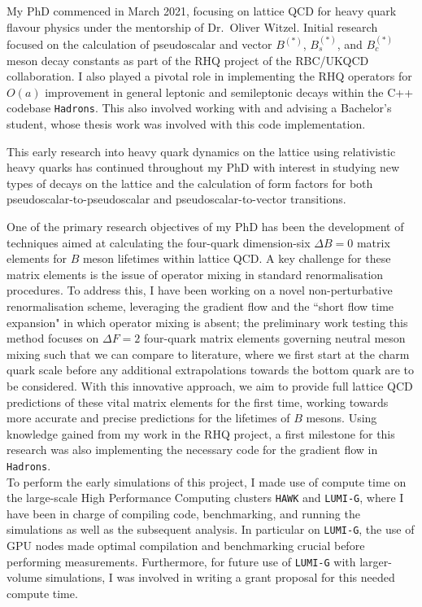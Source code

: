 \documentclass[11pt, a4paper]{awesome-cv}
\begin{document}
\begin{cvletter}
My PhD commenced in March 2021, focusing on lattice QCD for heavy quark flavour physics under the mentorship of Dr.~Oliver Witzel. 
Initial research focused on the calculation of pseudoscalar and vector $B^{(*)}$, $B_s^{(*)}$, and $B_c^{(*)}$ meson decay constants as part of the RHQ project of the RBC/UKQCD collaboration. 
I also played a pivotal role in implementing the RHQ operators for $O(a)$ improvement in general leptonic and semileptonic decays within the C++ codebase {\tt Hadrons}. 
This also involved working with and advising a Bachelor's student, whose thesis work was involved with this code implementation.

This early research into heavy quark dynamics on the lattice using relativistic heavy quarks has continued throughout my PhD with interest in studying new types of decays on the lattice and the calculation of form factors for both pseudoscalar-to-pseudoscalar and pseudoscalar-to-vector transitions.

One of the primary research objectives of my PhD has been the development of techniques aimed at calculating the four-quark dimension-six $\Delta B=0$ matrix elements for $B$ meson lifetimes within lattice QCD. 
A key challenge for these matrix elements is the issue of operator mixing in standard renormalisation procedures. 
To address this, I have been working on a novel non-perturbative renormalisation scheme, leveraging the gradient flow and the ``short flow time expansion" in which operator mixing is absent; the preliminary work testing this method focuses on $\Delta F=2$ four-quark matrix elements governing neutral meson mixing such that we can compare to literature, where we first start at the charm quark scale before any additional extrapolations towards the bottom quark are to be considered.
With this innovative approach, we aim to provide full lattice QCD predictions of these vital matrix elements for the first time, working towards more accurate and precise predictions for the lifetimes of $B$ mesons.
Using knowledge gained from my work in the RHQ project, a first milestone for this research was also implementing the necessary code for the gradient flow in {\tt Hadrons}.\\
To perform the early simulations of this project, I made use of compute time on the large-scale High Performance Computing clusters {\tt HAWK} and {\tt LUMI-G}, where I have been in charge of compiling code, benchmarking, and running the simulations as well as the subsequent analysis. 
In particular on {\tt LUMI-G}, the use of GPU nodes made optimal compilation and benchmarking crucial before performing measurements.
Furthermore, for future use of {\tt LUMI-G} with larger-volume simulations, I was involved in writing a grant proposal for this needed compute time.


\end{cvletter}
\end{document}
